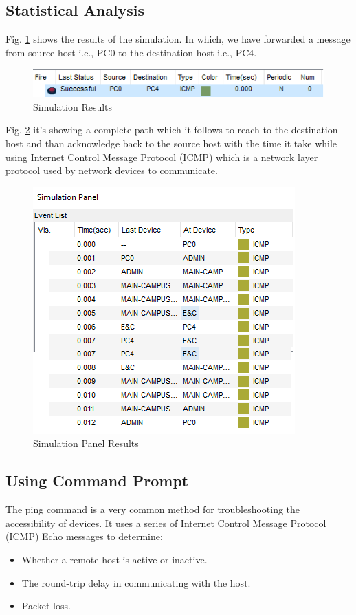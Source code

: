 \subsection{Statistical Analysis}
\label{analysis}
Fig. \ref{resultSimulation} shows the results of the simulation. In which, we have forwarded a message from source host i.e., PC0 to the destination host i.e., PC4.\\
\begin{figure}[H]  %
\begin{center}
\includegraphics[scale=1.3]{Chapter4/resultSimulation}
\caption{Simulation Results}
\label{resultSimulation}
\end{center}
\end{figure}
Fig. \ref{simulationPanel} it's showing a complete path which it follows to reach to the destination host and than acknowledge back to the source host with the time it take while using Internet Control Message Protocol (ICMP) which is a network layer protocol used by network devices to communicate.
\begin{figure}[H]  %
\begin{center}
\includegraphics[scale=1.0]{Chapter4/simulationPanel}
\caption{Simulation Panel Results}
\label{simulationPanel}
\end{center}
\end{figure}
\subsection{Using Command Prompt}
\noindent The ping command is a very common method for troubleshooting the accessibility of devices. It uses a series of Internet Control Message Protocol (ICMP) Echo messages to determine:\\
\begin{itemize}
\item Whether a remote host is active or inactive.

\item The round-trip delay in communicating with the host.

\item Packet loss.
\end{itemize}


